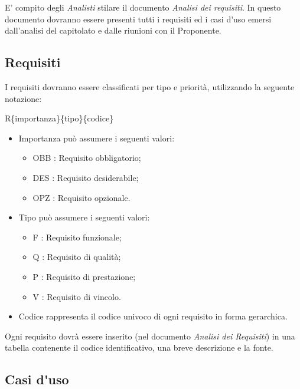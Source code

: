 E' compito degli \textit{Analisti} stilare il documento \textit{Analisi dei requisiti}.
In questo documento dovranno essere presenti tutti i requisiti ed i \gls{casi d'uso} emersi dall'analisi del capitolato e dalle riunioni con il Proponente.\\

\subsection{Requisiti}

I requisiti dovranno essere classificati per tipo e priorità, utilizzando la seguente notazione:

R\{importanza\}\{tipo\}\{codice\}
\begin{itemize}
  \item Importanza può assumere i seguenti valori:
\begin{itemize}
	\item {OBB} : Requisito obbligatorio;
	\item {DES} : Requisito desiderabile;
	\item {OPZ} : Requisito opzionale.
\end{itemize}
  \item Tipo può assumere i seguenti valori:
\begin{itemize}
	\item {F} : Requisito funzionale;
	\item {Q} : Requisito di qualità;
	\item {P} : Requisito di prestazione;
	\item {V} : Requisito di vincolo.
\end{itemize}
  \item Codice rappresenta il codice univoco di ogni requisito in forma gerarchica.
\end{itemize}
Ogni requisito dovrà essere inserito (nel documento \textit{Analisi dei Requisiti}) in una tabella contenente il codice identificativo, una breve descrizione e la fonte.

\subsection{\gls{Casi d'uso}}


